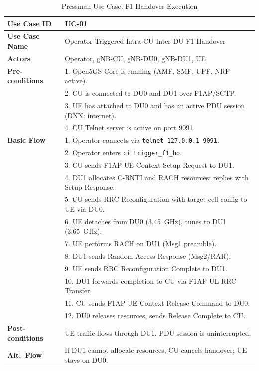 \begin{table}[H]
\centering
\small
\begin{tabular}{|l|p{11cm}|}
\hline
\textbf{Use Case ID} & UC-01 \\ \hline
\textbf{Use Case Name} & Operator-Triggered Intra-CU Inter-DU F1 Handover \\ \hline
\textbf{Actors} & Operator, gNB-CU, gNB-DU0, gNB-DU1, UE \\ \hline
\textbf{Pre-conditions} & 1. Open5GS Core is running (AMF, SMF, UPF, NRF active). \\
& 2. CU is connected to DU0 and DU1 over F1AP/SCTP. \\
& 3. UE has attached to DU0 and has an active PDU session (DNN: internet). \\
& 4. CU Telnet server is active on port 9091. \\ \hline
\textbf{Basic Flow} & 1. Operator connects via \texttt{telnet 127.0.0.1 9091}. \\
& 2. Operator enters \texttt{ci trigger\_f1\_ho}. \\
& 3. CU sends F1AP UE Context Setup Request to DU1. \\
& 4. DU1 allocates C-RNTI and RACH resources; replies with Setup Response. \\
& 5. CU sends RRC Reconfiguration with target cell config to UE via DU0. \\
& 6. UE detaches from DU0 (3.45~GHz), tunes to DU1 (3.65~GHz). \\
& 7. UE performs RACH on DU1 (Msg1 preamble). \\
& 8. DU1 sends Random Access Response (Msg2/RAR). \\
& 9. UE sends RRC Reconfiguration Complete to DU1. \\
& 10. DU1 forwards completion to CU via F1AP UL RRC Transfer. \\
& 11. CU sends F1AP UE Context Release Command to DU0. \\
& 12. DU0 releases resources; sends Release Complete to CU. \\ \hline
\textbf{Post-conditions} & UE traffic flows through DU1. PDU session is uninterrupted. \\ \hline
\textbf{Alt.~Flow} & If DU1 cannot allocate resources, CU cancels handover; UE stays on DU0. \\ \hline
\end{tabular}
\caption{Pressman Use Case: F1 Handover Execution}
\label{tab:usecase}
\end{table}

